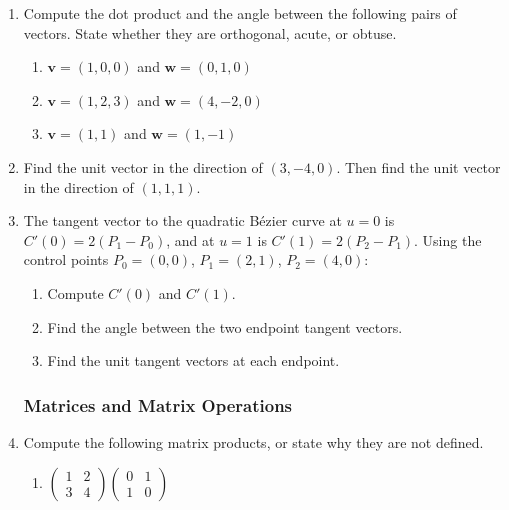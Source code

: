 \begin{enumerate}
\subsubsection*{Dot Products and Lengths}

\item Compute the dot product and the angle between the following pairs of vectors.
State whether they are orthogonal, acute, or obtuse.
\begin{enumerate}
  \item $\mathbf{v} = (1,0,0)$ and $\mathbf{w} = (0,1,0)$
  \item $\mathbf{v} = (1,2,3)$ and $\mathbf{w} = (4,-2,0)$
  \item $\mathbf{v} = (1,1)$ and $\mathbf{w} = (1,-1)$
\end{enumerate}

\item Find the unit vector in the direction of $(3, -4, 0)$.
Then find the unit vector in the direction of $(1, 1, 1)$.

\item The tangent vector to the quadratic Bézier curve at $u=0$ is
$C'(0) = 2(P_1 - P_0)$, and at $u=1$ is $C'(1) = 2(P_2 - P_1)$.
Using the control points $P_0 = (0,0)$, $P_1 = (2,1)$, $P_2 = (4,0)$:
\begin{enumerate}
  \item Compute $C'(0)$ and $C'(1)$.
  \item Find the angle between the two endpoint tangent vectors.
  \item Find the unit tangent vectors at each endpoint.
\end{enumerate}

\subsubsection*{Matrices and Matrix Operations}

\item Compute the following matrix products, or state why they are not defined.
\begin{enumerate}
  \item $\begin{pmatrix} 1 & 2 \\ 3 & 4 \end{pmatrix}
         \begin{pmatrix} 0 & 1 \\ 1 & 0 \end{pmatrix}$


\end{enumerate}
\end{enumerate}
